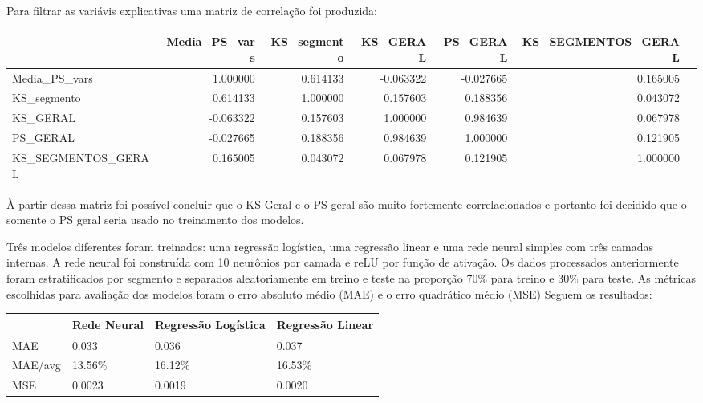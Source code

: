     Para filtrar as variávis explicativas uma matriz de correlação foi produzida:

\begin{adjustwidth}{-10in}{}
\begin{table}[H]
\fontsize{8}{12}\selectfont %
\setlength{\tabcolsep}{3pt} %
\begin{tabular}{lrrrrrr}
\toprule
{} &  Media\_PS\_vars &  KS\_segmento &  KS\_GERAL &  PS\_GERAL &  KS\_SEGMENTOS\_GERAL \\
\midrule
Media\_PS\_vars      &       1.000000 &     0.614133 & -0.063322 & -0.027665 &            0.165005\\
KS\_segmento        &       0.614133 &     1.000000 &  0.157603 &  0.188356 &            0.043072\\
KS\_GERAL           &      -0.063322 &     0.157603 &  1.000000 &  0.984639 &            0.067978 \\
PS\_GERAL           &      -0.027665 &     0.188356 &  0.984639 &  1.000000 &            0.121905 \\
KS\_SEGMENTOS\_GERAL &       0.165005 &     0.043072 &  0.067978 &  0.121905 &            1.000000 \\
\bottomrule
\end{tabular}
\end{table}
\end{adjustwidth}

À partir dessa matriz foi possível concluir que o KS Geral e o PS geral são muito fortemente correlacionados e portanto foi decidido que o somente o PS geral seria usado no treinamento dos modelos.

Três modelos diferentes foram treinados: uma regressão logística, uma regressão linear e uma rede neural simples com três camadas internas. A rede neural foi construída com 10 neurônios por camada e reLU por função de ativação. Os dados processados anteriormente foram estratificados por segmento e separados aleatoriamente em treino e teste na proporção 70\% para treino e 30\% para teste. As métricas escolhidas para avaliação dos modelos foram o erro absoluto médio (MAE) e o erro quadrático médio (MSE)
 Seguem os resultados:

\begin{table}[H]
\centering
\begin{tabular}{|l|l|l|l|}
\hline
        & Rede Neural & Regressão Logística & Regressão Linear \\ \hline
MAE     & 0.033       & 0.036               & 0.037            \\ \hline
MAE/avg & 13.56\%     & 16.12\%             & 16.53\%          \\ \hline
MSE     & 0.0023      & 0.0019              & 0.0020           \\ \hline
\end{tabular}
\end{table}

